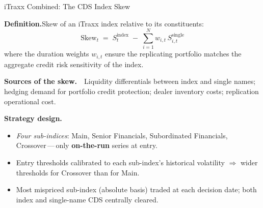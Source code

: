 \documentclass[aspectratio=169,11pt]{beamer}
\newcommand{\hlt}[1]{\textcolor{edhecred}{\textbf{#1}}}     %
\begin{document}
\begin{frame}[t]{iTraxx Combined: The CDS Index Skew}
\small

\textbf{Definition.}\hfill {\small Skew of an iTraxx index relative to its constituents:}
\[
  \text{Skew}_t \;=\; S_t^{\text{index}} \;-\; \sum_{i=1}^{N} w_{i,t}\, S_{i,t}^{\text{single}}
\]
where the duration weights $w_{i,t}$ ensure the replicating portfolio matches
the aggregate credit risk sensitivity of the index.

\vspace{0.30cm}

\textbf{Sources of the skew.}\ \ Liquidity differentials between index and
single names; hedging demand for portfolio credit protection; dealer inventory
costs; replication operational cost.

\vspace{0.30cm}

\textbf{Strategy design.}
\begin{itemize}\itemsep=0.07cm
  \item \emph{Four sub-indices}: Main, Senior Financials, Subordinated
        Financials, Crossover\,---\,only \hlt{on-the-run} series at entry.
  \item Entry thresholds calibrated to each sub-index's historical volatility
        $\Rightarrow$ wider thresholds for Crossover than for Main.
  \item Most mispriced sub-index (absolute basis) traded at each decision date;
        both index and single-name CDS centrally cleared.
\end{itemize}

\end{frame}
\end{document}
